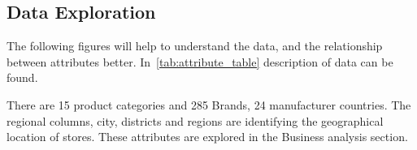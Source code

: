 \documentclass[conference]{IEEEtran}
\begin{document}

\subsection{Data Exploration}
The following figures will help to understand the data, and the relationship between attributes better. In~\autoref{tab:attribute_table}  description of data can be found.

There are 15 product categories and 285 Brands, 24 manufacturer countries. The regional columns, city, districts and regions are identifying the geographical location of stores. These attributes are explored in the Business analysis section.

\end{document}
